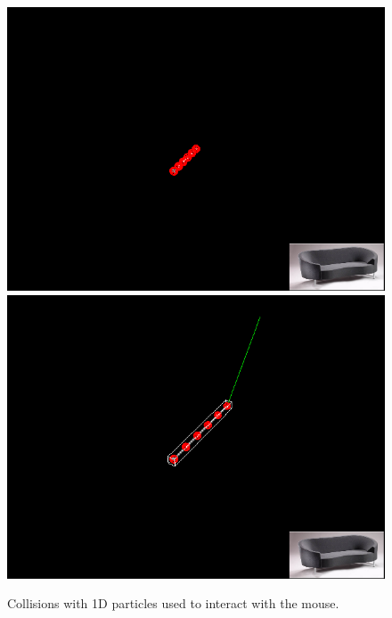 \begin{figure}
\includegraphics[width=0.5\linewidth]{fig/mass1d-collision1}\includegraphics[width=0.5\linewidth]{fig/mass1d-collision2}
\caption{Collisions with 1D particles used to interact with the mouse.}\label{fig:mass1d-collision}
\end{figure}

